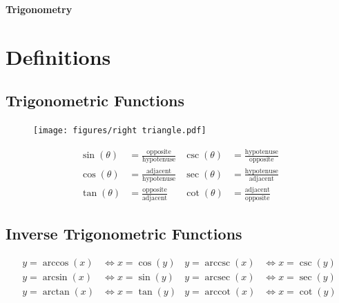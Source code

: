 \documentclass{article}
\date{}
\DeclareMathOperator{\arccot}{arccot}
\DeclareMathOperator{\arcsec}{arcsec}
\DeclareMathOperator{\arccsc}{arccsc}
\newcommand{\docTitle}{Trigonometry}
\begin{document}
%
\begin{titlepage}
    \vspace*{\fill}
    \begin{center}
        \LARGE
        \textbf{\docTitle}
    \end{center}
    \vspace*{\fill}
    \doclicenseThis
    \thispagestyle{empty}
\end{titlepage}
\newpage
%
\tableofcontents
\newpage
%
\renewcommand*{\arraystretch}{1.25}
\section{Definitions}
\subsection{Trigonometric Functions}
\begin{figure}[H]
    \centering
    \texttt{[image: figures/right triangle.pdf]}
\end{figure}
\begin{align*}
    \sin{\left( \theta \right)} & = \frac{\text{opposite}}{\text{hypotenuse}} & \csc{\left( \theta \right)} & = \frac{\text{hypotenuse}}{\text{opposite}} \\
    \cos{\left( \theta \right)} & = \frac{\text{adjacent}}{\text{hypotenuse}} & \sec{\left( \theta \right)} & = \frac{\text{hypotenuse}}{\text{adjacent}} \\
    \tan{\left( \theta \right)} & = \frac{\text{opposite}}{\text{adjacent}}   & \cot{\left( \theta \right)} & = \frac{\text{adjacent}}{\text{opposite}}
\end{align*}
\subsection{Inverse Trigonometric Functions}
\begin{align*}
    y = \arccos{\left( x \right)} & \iff x = \cos{\left( y \right)} & y = \arccsc{\left( x \right)} & \iff x = \csc{\left( y \right)} \\
    y = \arcsin{\left( x \right)} & \iff x = \sin{\left( y \right)} & y = \arcsec{\left( x \right)} & \iff x = \sec{\left( y \right)} \\
    y = \arctan{\left( x \right)} & \iff x = \tan{\left( y \right)} & y = \arccot{\left( x \right)} & \iff x = \cot{\left( y \right)}
\end{align*}
\end{document}
